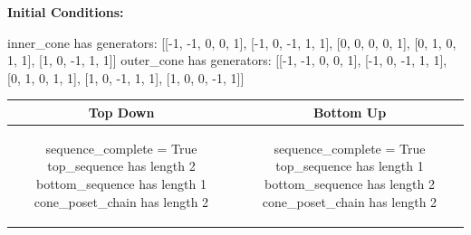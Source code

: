 \documentclass[10pt]{article}
\begin{document}
\textbf{Initial Conditions:}
\begin{SAGE}
inner_cone has generators: 
[[-1, -1, 0, 0, 1], [-1, 0, -1, 1, 1], [0, 0, 0, 0, 1], [0, 1, 0, 1, 1], [1, 0, -1, 1, 1]]
outer_cone has generators: 
[[-1, -1, 0, 0, 1], [-1, 0, -1, 1, 1], [0, 1, 0, 1, 1], [1, 0, -1, 1, 1], [1, 0, 0, -1, 1]]

\end{SAGE}
\begin{tabular}{c|c}
\textbf{Top Down} & \textbf{Bottom Up} \\ \hline  
\begin{SAGE}
sequence_complete = True
top_sequence has length 2
bottom_sequence has length 1
cone_poset_chain has length 2
\end{SAGE} 
&
\begin{SAGE}
sequence_complete = True
top_sequence has length 1
bottom_sequence has length 2
cone_poset_chain has length 2
\end{SAGE} 
\\ \hline


\end{tabular}
\end{document}
